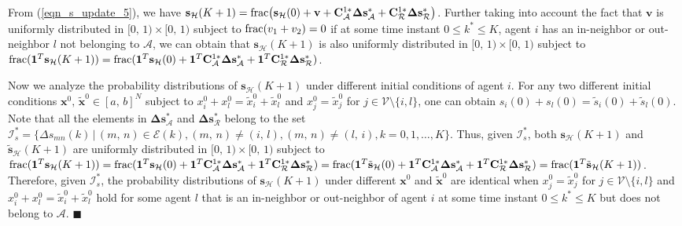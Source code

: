 \documentclass{IEEEtran}
\begin{document}
From (\ref{eqn_s_update_5}), we have $\mathbf{s}_{\mathcal{H}}(K+1)={\rm frac}\big(\mathbf{s}_{\mathcal{H}}(0) + \mathbf{v} + \mathbf{C}_{\mathcal{A}}^{1*} \boldsymbol{\Delta}\mathbf{s}_{\mathcal{A}}^* + \mathbf{C}_{\mathcal{R}}^{1*} \boldsymbol{\Delta}\mathbf{s}_{\mathcal{R}}^*\big)$. Further taking into account the fact that $\mathbf{v}$ is uniformly distributed in $[0, \, 1) \times [0, \, 1)$ subject to ${\rm frac}(v_1 + v_2) =0$ if at some time instant $0\leq k^* \leq K$, agent $i$ has an in-neighbor or out-neighbor $l$ not belonging to $\mathcal{A}$, we can obtain that $\mathbf{s}_{\mathcal{H}}(K+1)$ is also uniformly distributed in $[0, \, 1) \times [0, \, 1)$ subject to ${\rm frac}(\mathbf{1}^T\mathbf{s}_{\mathcal{H}}(K+1)) = {\rm frac}(\mathbf{1}^T\mathbf{s}_{\mathcal{H}}(0) + \mathbf{1}^T \mathbf{C}_{\mathcal{A}}^{1*} \boldsymbol{\Delta}\mathbf{s}_{\mathcal{A}}^* + \mathbf{1}^T \mathbf{C}_{\mathcal{R}}^{1*} \boldsymbol{\Delta}\mathbf{s}_{\mathcal{R}}^*)$.

Now we analyze the probability distributions of $\mathbf{s}_{\mathcal{H}}(K+1)$ under different initial conditions of agent $i$. For any two different initial conditions $\mathbf{x}^0, \, \tilde{\mathbf{x}}^0 \in [a, \, b]^N$ subject to $x_i^0+x_l^0=\tilde{x}_i^0+\tilde{x}_l^0$ and $x_j^0=\tilde{x}_j^0$ for $j\in \mathcal{V}\setminus \{i,l\}$, one can obtain $s_i(0)+s_l(0) = \tilde{s}_i(0)+\tilde{s}_l(0)$. Note that all the elements in $\boldsymbol{\Delta}\mathbf{s}_{\mathcal{A}}^*$ and $\boldsymbol{\Delta}\mathbf{s}_{\mathcal{R}}^*$ belong to the set $\mathcal{I}_s^* = \{\Delta s_{mn}(k) \, | \, (m,\,n) \in \mathcal{E}(k), (m,\,n)\neq (i,\,l), (m,\,n)\neq (l,\,i), k=0,1,\ldots,K\}$. Thus, given $\mathcal{I}_s^*$, both $\mathbf{s}_{\mathcal{H}}(K+1)$ and $\tilde{\mathbf{s}}_{\mathcal{H}}(K+1)$ are uniformly distributed in $[0, \, 1) \times [0, \, 1)$ subject to ${\rm frac}(\mathbf{1}^T\mathbf{s}_{\mathcal{H}}(K+1)) = {\rm frac}(\mathbf{1}^T\mathbf{s}_{\mathcal{H}}(0) + \mathbf{1}^T \mathbf{C}_{\mathcal{A}}^{1*} \boldsymbol{\Delta}\mathbf{s}_{\mathcal{A}}^* + \mathbf{1}^T \mathbf{C}_{\mathcal{R}}^{1*} \boldsymbol{\Delta}\mathbf{s}_{\mathcal{R}}^*) = {\rm frac}(\mathbf{1}^T\tilde{\mathbf{s}}_{\mathcal{H}}(0) + \mathbf{1}^T \mathbf{C}_{\mathcal{A}}^{1*} \boldsymbol{\Delta}\mathbf{s}_{\mathcal{A}}^* + \mathbf{1}^T \mathbf{C}_{\mathcal{R}}^{1*} \boldsymbol{\Delta}\mathbf{s}_{\mathcal{R}}^*) = {\rm frac}(\mathbf{1}^T \tilde{\mathbf{s}}_{\mathcal{H}}(K+1))$. Therefore, given $\mathcal{I}_s^*$, the probability distributions of $\mathbf{s}_{\mathcal{H}}(K+1)$ under different $\mathbf{x}^0$ and $\tilde{\mathbf{x}}^0$ are identical when $x_j^0=\tilde{x}_j^0$ for $j\in \mathcal{V}\setminus \{i,l\}$ and $x_i^0+x_l^0=\tilde{x}_i^0+\tilde{x}_l^0$ hold for some agent $l$ that is an in-neighbor or out-neighbor of agent $i$ at some time instant $0\leq k^* \leq K$ but does not belong to $\mathcal{A}$. \hfill{$\blacksquare$}
\end{document}
